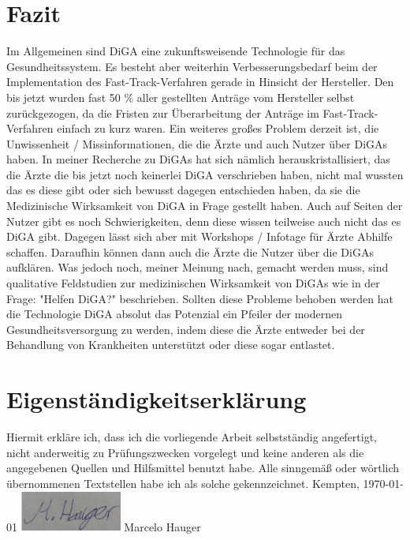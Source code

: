 \documentclass{article}
\begin{document}
	\section{Fazit}
		Im Allgemeinen sind DiGA eine zukunftsweisende Technologie für das Gesundheitssystem. Es besteht aber weiterhin Verbesserungsbedarf beim der Implementation des Fast-Track-Verfahren gerade in Hinsicht der Hersteller. Den bis jetzt wurden fast 50 \% aller gestellten Anträge vom Hersteller selbst zurückgezogen, da die Fristen zur Überarbeitung der Anträge im Fast-Track-Verfahren einfach zu kurz waren. Ein weiteres großes Problem derzeit ist, die Unwissenheit / Missinformationen, die die Ärzte und auch Nutzer über DiGAs haben. In meiner Recherche zu DiGAs hat sich nämlich herauskristallisiert, das die Ärzte die bis jetzt noch keinerlei DiGA verschrieben haben, nicht mal wussten das es diese gibt oder sich bewusst dagegen entschieden haben, da sie die Medizinische Wirksamkeit von DiGA in Frage gestellt haben. Auch auf Seiten der Nutzer gibt es noch Schwierigkeiten, denn diese wissen teilweise auch nicht das es DiGA gibt. Dagegen lässt sich aber mit Workshops / Infotage für Ärzte Abhilfe schaffen. Daraufhin können dann auch die Ärzte die Nutzer über die DiGAs aufklären. Was jedoch noch, meiner Meinung nach, gemacht werden muss, sind qualitative Feldstudien zur medizinischen Wirksamkeit von DiGAs wie in der Frage: "Helfen DiGA?" beschrieben. Sollten diese Probleme behoben werden hat die Technologie DiGA absolut das Potenzial ein Pfeiler der modernen Gesundheitsversorgung zu werden, indem diese die Ärzte entweder bei der Behandlung von Krankheiten unterstützt oder diese sogar entlastet.
		\newpage
	\section{Eigenständigkeitserklärung}
		Hiermit erkläre ich, dass ich die vorliegende Arbeit selbstständig angefertigt, nicht anderweitig zu Prüfungszwecken vorgelegt und keine anderen als die angegebenen Quellen und Hilfsmittel benutzt habe.
		\newline  
		\newline
		Alle sinngemäß oder wörtlich übernommenen Textstellen habe ich als solche gekennzeichnet.
		\newline
		\newline
		\newline
		Kempten, \today 
		\newline
		\newline
		\newline
		\includegraphics[width=0.25\textwidth]{./grafiken/unterschrift} 
		\newline
		Marcelo Hauger 
		\newpage

			   	 
\end{document}
